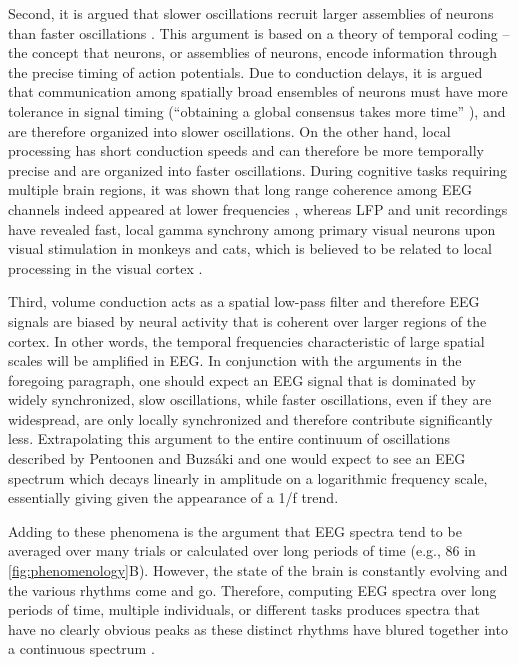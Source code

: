 Second, it is argued that slower oscillations recruit larger assemblies of neurons than faster oscillations \cite{Buzsaki2006, Buzsaki2012c, Buzsaki2010}. This argument is based on a theory of temporal coding -- the concept that neurons, or assemblies of neurons, encode information through the precise timing of action potentials. Due to conduction delays, it is argued that communication among spatially broad ensembles of neurons must have more tolerance in signal timing (``obtaining a global consensus takes more time'' \cite{Buzsaki2006}), and are therefore organized into slower oscillations. On the other hand, local processing has short conduction speeds and can therefore be more temporally precise and are organized into faster oscillations. During cognitive tasks requiring multiple brain regions, it was shown that long range coherence among EEG channels indeed appeared at lower frequencies \cite{Sarnthein1998,VonStein1999}, whereas LFP and unit recordings have revealed fast, local gamma synchrony among primary visual neurons upon visual stimulation in monkeys and cats, which is believed to be related to local processing in the visual cortex \cite{Gray1989,Eckhorn1994}.

Third, volume conduction acts as a spatial low-pass filter \cite{Nunez2006} and therefore EEG signals are biased by neural activity that is coherent over larger regions of the cortex. In other words, the temporal frequencies characteristic of large spatial scales will be amplified in EEG. In conjunction with the arguments in the foregoing paragraph, one should expect an EEG signal that is dominated by widely synchronized, slow oscillations, while faster oscillations, even if they are widespread, are only locally synchronized and therefore contribute significantly less. Extrapolating this argument to the entire continuum of oscillations described by Pentoonen and Buzsáki \cite{Penttonen2003} and one would expect to see an EEG spectrum which decays linearly in amplitude on a logarithmic frequency scale, essentially giving given the appearance of a 1/f trend.

Adding to these phenomena is the argument that EEG spectra tend to be averaged over many trials or calculated over long periods of time (e.g., \qty{86}{\min} in \autoref{fig:phenomenology}B). However, the state of the brain is constantly evolving and the various rhythms come and go. Therefore, computing EEG spectra over long periods of time, multiple individuals, or different tasks produces spectra that have no clearly obvious peaks as these distinct rhythms have blured together into a continuous spectrum \cite{Buzsaki2006}.

